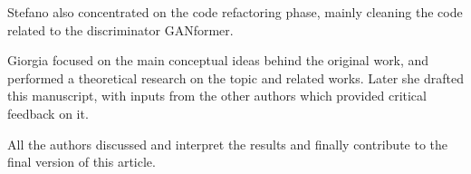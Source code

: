 \documentclass{article}
\begin{document}
Stefano also concentrated on the code refactoring phase, mainly cleaning the code related to the 
discriminator GANformer.

Giorgia focused on the main conceptual ideas behind the original work, and performed a theoretical 
research on the topic and related works. 
Later she drafted this manuscript, with inputs from the other authors which provided critical 
feedback on it. 

All the authors discussed and interpret the results and finally contribute to the final version of this 
article.

\clearpage
\appendix
%	
%	
%	
%	
\end{document}
